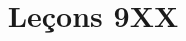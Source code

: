 \documentclass{article}
\title{Leçons 9XX}
\begin{document}
\maketitle

\rapports

\indispensables

\pieges

\idees

\questionsclassiques


\begin{itemize}

\end{itemize}

\dev

\begin{itemize}

\end{itemize}
\end{document}
